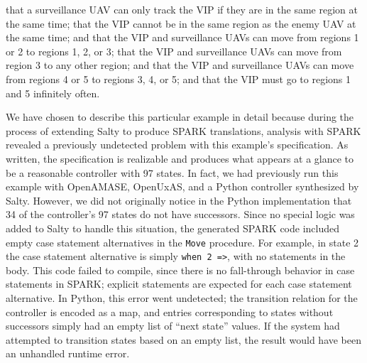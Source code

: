 \documentclass[runningheads]{llncs}
\begin{document}
 that a surveillance UAV can only track the VIP if they are in the same region at the same time; 
 that the VIP cannot be in the same region as the enemy UAV at the same time; 
 and  that the VIP and surveillance UAVs can move from regions 1 or 2 to regions 1, 2, or 3;
 that the VIP and surveillance UAVs can move from region 3 to any other region; 
 and  that the VIP and surveillance UAVs can move from regions 4 or 5 to regions 3, 4, or 5; 
and  that the VIP must go to regions 1 and 5 infinitely often.

We have chosen to describe this particular example in detail because during the process of extending Salty to produce SPARK translations, 
analysis with SPARK revealed a previously undetected problem with this example's specification. 
As written, the specification is realizable and produces what appears at a glance to be a reasonable controller with 97 states. 
In fact, we had previously run this example with OpenAMASE, OpenUxAS, and a Python controller synthesized by Salty. 
However, we did not originally notice in the Python implementation that 34 of the controller's 97 states do not have successors. 
Since no special logic was added to Salty to handle this situation, the generated SPARK code included empty case statement alternatives in the \lstinline{Move} procedure. 
For example, in state 2 the case statement alternative is simply \lstinline{when 2 =>}, with no statements in the body. 
This code failed to compile, since there is no fall-through behavior in case statements in SPARK; 
explicit statements are expected for each case statement alternative. 
In Python, this error went undetected; 
the transition relation for the controller is encoded as a map, and entries corresponding to states without successors 
simply had an empty list of ``next state'' values. 
If the system had attempted to transition states based on an empty list, the result would have been an unhandled runtime error. 
\end{document}
